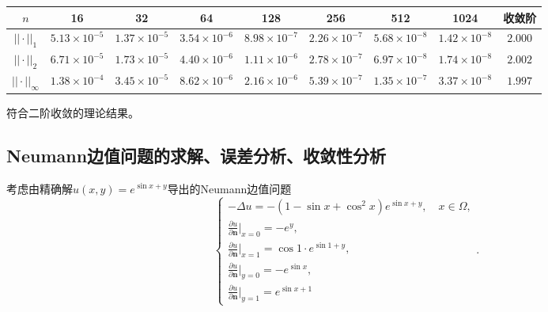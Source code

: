 \documentclass[lang=cn,10pt]{elegantbook}
\begin{document}
\begin{table}[H]
  \centering
  \small
  \begin{tabular}{c|ccccccc|c}
  \textbf{$n$}        & 16                   & 32                   & 64                   & 128                  & 256                  & 512                  & 1024                  & 收敛阶 \\ \hline
  $||\cdot||_1$      & $5.13\times 10^{-5}$ & $1.37\times 10^{-5}$ & $3.54\times 10^{-6}$ & $8.98\times 10^{-7}$ & $2.26\times 10^{-7}$ & $5.68\times 10^{-8}$ & $1.42\times 10^{-8}$ & $2.000$\\
  $||\cdot||_2$      & $6.71\times 10^{-5}$ & $1.73\times 10^{-5}$ & $4.40\times 10^{-6}$ & $1.11\times 10^{-6}$ & $2.78\times 10^{-7}$ & $6.97\times 10^{-8}$ & $1.74\times 10^{-8}$ & $2.002$\\
  $||\cdot||_\infty$ & $1.38\times 10^{-4}$ & $3.45\times 10^{-5}$ & $8.62\times 10^{-6}$ & $2.16\times 10^{-6}$ & $5.39\times 10^{-7}$ & $1.35\times 10^{-7}$ & $3.37\times 10^{-8}$ & $1.997$
  \end{tabular}
\end{table}

符合二阶收敛的理论结果。

\subsection{Neumann边值问题的求解、误差分析、收敛性分析}

考虑由精确解$u(x,y)=e^{\sin x+y}$导出的Neumann边值问题
\begin{equation}
  \left\{
    \begin{array}{l}
      -\Delta u = -(1-\sin x+\cos^2 x)e^{\sin x + y},\quad x\in\Omega, \\
      \frac{\partial u}{\partial \mathbf{n}}|_{x=0}=-e^{y},\\
      \frac{\partial u}{\partial \mathbf{n}}|_{x=1}=\cos 1 \cdot e^{\sin 1 + y},\\
      \frac{\partial u}{\partial \mathbf{n}}|_{y=0}=-e^{\sin x},\\
      \frac{\partial u}{\partial \mathbf{n}}|_{y=1}=e^{\sin x+1}
    \end{array}
  \right. .
\end{equation}
\end{document}
